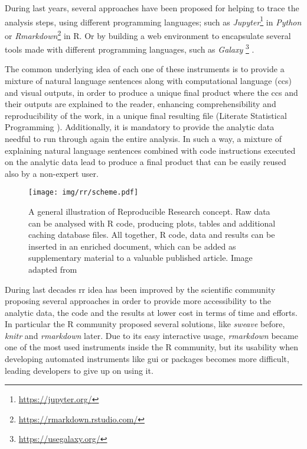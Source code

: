 During last years, several approaches \cite{russo2015advantages} have been proposed for helping to trace the analysis steps, using different programming languages; such as  \textit{Jupyter}\footnote{\url{https://jupyter.org/}} \cite{Kluyver2016} in \textit{Python} or \textit{Rmarkdown}\footnote{\url{https://rmarkdown.rstudio.com/}} in R.
Or by building a web environment to encapsulate several tools made with different programming languages, such as \textit{Galaxy} \footnote{\url{https://usegalaxy.org/}} \cite{Blankenberg2010, Giardine2005, Goecks2010}.

The common underlying idea of each one of these instruments is to provide a mixture of natural language sentences along with computational language (\glspl{cc}) and visual outputs, in order to produce a unique final product where the \glspl{cc} and their outputs are explained to the reader, enhancing comprehensibility and reproducibility of the work, in a unique final resulting file (Literate Statistical Programming \cite{Knuth1984a}).
Additionally, it is mandatory to provide the analytic data needful to run through again the entire analysis.
In such a way, a mixture of explaining natural language sentences combined with code instructions executed on the analytic data lead to produce a final product that can be easily reused also by a non-expert user.

\begin{figure}[H]
\centering
\texttt{[image: img/rr/scheme.pdf]}
\caption[Reproducible Research illustration]{A general illustration of Reproducible Research concept. Raw data can be analysed with R code, producing plots, tables and additional caching database files. All together, R code, data and results can be inserted in an enriched document, which can be added as supplementary material to a valuable published article.\newline
Image adapted from \cite{RussoRighelli2016}}
\label{fig:rrscheme}
\end{figure}

During last decades \gls{rr} idea has been improved by the scientific community proposing several approaches in order to provide more accessibility to the analytic data, the code and the results at lower cost in terms of time and efforts.
In particular the R community proposed several solutions, like \textit{sweave} \cite{Leisch2002a, Leisch2002} before, \textit{knitr} \cite{Xie2012} and \textit{rmarkdown} later.
Due to its easy interactive usage, \textit{rmarkdown} became one of the most used instruments inside the R community, but its usability when developing automated instruments like \gls{gui} or packages becomes more difficult, leading developers to give up on using it.

